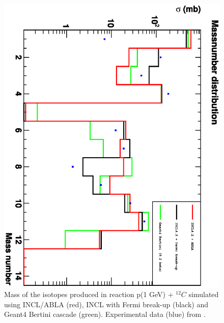 \documentclass[12pt]{article}
\begin{document}



\clearpage
\begin{figure}
\includegraphics[angle=90,scale=0.50]{masses.eps}
\caption{Mass of the isotopes produced in reaction p(1 GeV) + $^{12}C$
simulated using INCL/ABLA (red), INCL with Fermi break-up (black) and
Geant4 Bertini cascade (green). Experimental data (blue) from
\cite{carbone}.}
\end{figure}
\end{document}
